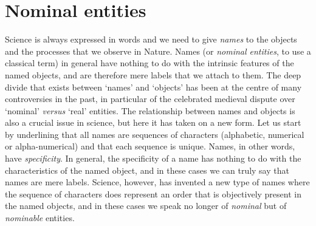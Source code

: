 \documentclass[12pt]{article}
\begin{document}
\hypertarget{nominal_entities}{}
\section{Nominal entities}
Science is always expressed in words and we need to give \textit{names} to the objects and the processes that we observe in Nature. Names (or \textit{nominal entities}, to use a classical term) in general have nothing to do with the intrinsic features of the named objects, and are therefore mere labels that we attach to them. The deep divide that exists between `names' and `objects' has been at the centre of many controversies in the past, in particular of the celebrated medieval dispute over `nominal' \textit{versus} `real' entities. The relationship between names and objects is also a crucial issue in science, but here it has taken on a new form. Let us start by underlining that all names are sequences of characters (alphabetic, numerical or alpha-numerical) and that each sequence is unique. Names, in other words, have \textit{specificity}. In general, the specificity of a name has nothing to do with the characteristics of the named object, and in these cases we can truly say that names are mere labels. Science, however, has invented a new type of names where the sequence of characters does represent an order that is objectively present in the named objects, and in these cases we speak no longer of \textit{nominal} but of \textit{nominable} entities. 

\hypertarget{nominable_entity}{}
\end{document}
